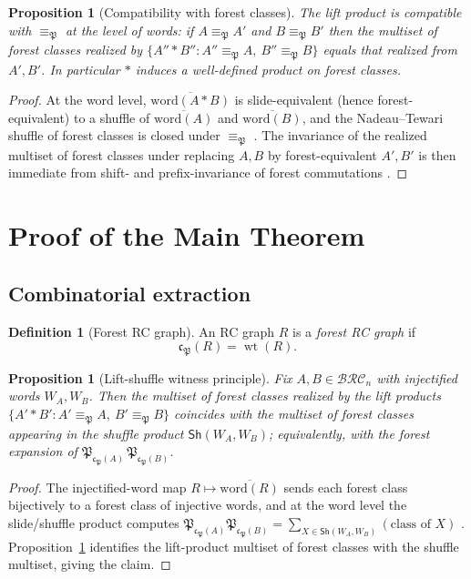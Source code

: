 \documentclass{amsart}
\newtheorem{proposition}[theorem]{Proposition}
\theoremstyle{definition}
\newtheorem{definition}[theorem]{Definition}
\theoremstyle{remark}
\newcommand{\BRC}{\mathcal{BRC}}
\newcommand{\forest}{\mathfrak{P}}
\newcommand{\code}{\mathfrak{c}}
\newcommand{\wtt}{\operatorname{wt}}
\begin{document}
\begin{proposition}[Compatibility with forest classes]\label{prop:lift_compat_forest}
The lift product is compatible with $\equiv_{\forest}$ at the level of words: if $A\equiv_{\forest}A'$ and $B\equiv_{\forest}B'$ then the multiset of forest classes realized by $\{A''*B'':A''\equiv_{\forest}A,\ B''\equiv_{\forest}B\}$ equals that realized from $A',B'$. In particular $*$ induces a well-defined product on forest classes.
\end{proposition}
\begin{proof}
At the word level, $\overline{\mathrm{word}(A*B)}$ is slide-equivalent (hence forest-equivalent) to a shuffle of $\overline{\mathrm{word}(A)}$ and $\overline{\mathrm{word}(B)}$, and the Nadeau--Tewari shuffle of forest classes is closed under $\equiv_{\forest}$ \cite[Theorem~6.3]{nadeau2024forest}. The invariance of the realized multiset of forest classes under replacing $A,B$ by forest-equivalent $A',B'$ is then immediate from shift- and prefix-invariance of forest commutations \cite[Proposition~5.8, Lemma~5.9]{nadeau2024forest}.
\end{proof}

\section{Proof of the Main Theorem}

\subsection{Combinatorial extraction}
\begin{definition}[Forest RC graph]
An RC graph $R$ is a \emph{forest RC graph} if
\[
\code_{\forest}(R)=\wtt(R).
\]
\end{definition}

\begin{proposition}[Lift-shuffle witness principle]\label{proposition:liftshufflewords}
Fix $A,B\in\BRC_n$ with injectified words $W_A,W_B$. Then the multiset of forest classes realized by the lift products $\{A'*B':A'\equiv_{\forest}A,\ B'\equiv_{\forest}B\}$ coincides with the multiset of forest classes appearing in the shuffle product $\mathsf{Sh}(W_A,W_B)$; equivalently, with the forest expansion of $\forest_{\code_{\forest}(A)}\,\forest_{\code_{\forest}(B)}$.
\end{proposition}
\begin{proof}
The injectified-word map $R\mapsto\overline{\mathrm{word}(R)}$ sends each forest class bijectively to a forest class of injective words, and at the word level the slide/shuffle product computes $\forest_{\code_{\forest}(A)}\forest_{\code_{\forest}(B)}=\sum_{X\in\mathsf{Sh}(W_A,W_B)}(\text{class of }X)$ \cite[Theorem~6.3]{nadeau2024forest}. Proposition~\ref{prop:lift_compat_forest} identifies the lift-product multiset of forest classes with the shuffle multiset, giving the claim.
\end{proof}
\end{document}
